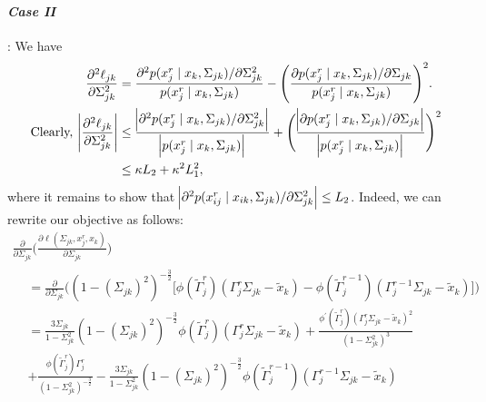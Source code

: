 \begin{condition}
    \paragraph{\textit{Case II}}: We have
    \begin{equation}\label{hessian_case2}
        \begin{split}
            \frac{\partial^2\ell_{jk}}{\partial \Sigma_{jk}^{2}} &= \frac{\partial^2 p(x_j^{r} \mid x_{k}, \Sigma_{jk})/\partial \Sigma_{jk}^{2}}{p(x_j^{r} \mid x_{k}, \Sigma_{jk})} - \Bigg(\frac{\partial p(x_j^{r} \mid x_{k}, \Sigma_{jk}) / \partial \Sigma_{jk}}{p(x_j^{r} \mid x_{k}, \Sigma_{jk})}\Bigg)^2. \\
            \text{Clearly, } \abs{\frac{\partial^2\ell_{jk}}{\partial \Sigma_{jk}^{2}}} &\leq \frac{\abs{\partial^2 p(x_j^{r} \mid x_{k}, \Sigma_{jk})/\partial \Sigma_{jk}^{2}}}{\abs{p(x_j^{r} \mid x_{k}, \Sigma_{jk})}} + \Bigg( \frac{\abs{\partial p(x_j^{r} \mid x_{k}, \Sigma_{jk}) / \partial \Sigma_{jk}}}{\abs{p(x_j^{r} \mid x_{k}, \Sigma_{jk})}} \Bigg)^2 \\
            &\leq \kappa L_2 + \kappa^2 L_1^2,
        \end{split}
    \end{equation}
    where it remains to show that $\abs{\partial^2 p(x_{ij}^{r} \mid x_{ik}, \Sigma_{jk})/\partial \Sigma_{jk}^{2}} \leq L_2$. Indeed, we can rewrite our objective as follows:
    \begin{multline}\label{second_derivative_case2}
            \frac{\partial}{\partial \Sigma_{jk}} \Bigg(\frac{\partial\ell(\Sigma_{jk}, x_j^r,x_k)}{\partial \Sigma_{jk}}\Bigg) \\
            \begin{aligned}
            &= \frac{\partial}{\partial \Sigma_{jk}}\Bigg( (1-(\Sigma_{jk})^2)^{-\frac{3}{2}} \Bigg[\phi({\tilde{\Gamma}}_j^{r})({\Gamma}_j^r\Sigma_{jk} - {\tilde{x}}_{k}) - \phi({\tilde{\Gamma}}_j^{r-1})({\Gamma}_j^{r-1}\Sigma_{jk} - {\tilde{x}}_{k})\Bigg] \Bigg) \\
            &= \frac{3\Sigma_{jk}}{1-\Sigma_{jk}^2} (1-(\Sigma_{jk})^2)^{-\frac{3}{2}} \phi({\tilde{\Gamma}}_j^{r})({\Gamma}_j^r\Sigma_{jk} - {\tilde{x}}_{k}) + \frac{\phi^\prime({\tilde{\Gamma}}_j^{r})({\Gamma}_j^r\Sigma_{jk} - {\tilde{x}}_{k})^2}{(1-\Sigma_{jk}^2)^3} \\
            &+ \frac{\phi({\tilde{\Gamma}}_j^{r}){\Gamma}_j^{r}}{(1-\Sigma_{jk}^2)^{-\frac{3}{2}}} - \frac{3\Sigma_{jk}}{1-\Sigma_{jk}^2} (1-(\Sigma_{jk})^2)^{-\frac{3}{2}} \phi({\tilde{\Gamma}}_j^{r-1})({\Gamma}_j^{r-1}\Sigma_{jk} - {\tilde{x}}_{k}) \\

\end{aligned}
\end{multline}
\end{condition}
